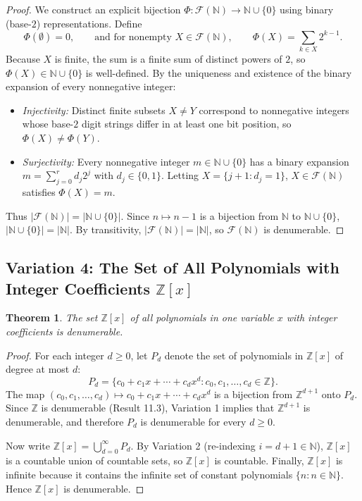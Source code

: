 \documentclass[11pt, letterpaper]{article}
\newtheorem{theorem}{Theorem}[section]
\theoremstyle{definition}
\theoremstyle{remark}
\begin{document}
\begin{proof}
We construct an explicit bijection $\Phi : \mathcal{F}(\mathbb{N}) \to \mathbb{N} \cup \{0\}$ using binary (base-$2$) representations. Define
\[
\Phi(\emptyset) = 0, \qquad \text{and for nonempty } X \in \mathcal{F}(\mathbb{N}), \qquad \Phi(X) = \sum_{k \in X} 2^{k - 1}.
\]
Because $X$ is finite, the sum is a finite sum of distinct powers of $2$, so $\Phi(X) \in \mathbb{N} \cup \{0\}$ is well-defined. By the uniqueness and existence of the binary expansion of every nonnegative integer:
\begin{itemize}
    \item \emph{Injectivity:} Distinct finite subsets $X \neq Y$ correspond to nonnegative integers whose base-$2$ digit strings differ in at least one bit position, so $\Phi(X) \neq \Phi(Y)$.
    \item \emph{Surjectivity:} Every nonnegative integer $m \in \mathbb{N} \cup \{0\}$ has a binary expansion $m = \sum_{j=0}^{r} d_j 2^j$ with $d_j \in \{0, 1\}$. Letting $X = \{j + 1 : d_j = 1\}$, $X \in \mathcal{F}(\mathbb{N})$ satisfies $\Phi(X) = m$.
\end{itemize}
Thus $|\mathcal{F}(\mathbb{N})| = |\mathbb{N} \cup \{0\}|$. Since $n \mapsto n - 1$ is a bijection from $\mathbb{N}$ to $\mathbb{N} \cup \{0\}$, $|\mathbb{N} \cup \{0\}| = |\mathbb{N}|$. By transitivity, $|\mathcal{F}(\mathbb{N})| = |\mathbb{N}|$, so $\mathcal{F}(\mathbb{N})$ is denumerable.
\end{proof}

\subsection{Variation 4: The Set of All Polynomials with Integer Coefficients $\mathbb{Z}[x]$}

\begin{theorem}
The set $\mathbb{Z}[x]$ of all polynomials in one variable $x$ with integer coefficients is denumerable.
\end{theorem}

\begin{proof}
For each integer $d \ge 0$, let $P_d$ denote the set of polynomials in $\mathbb{Z}[x]$ of degree at most $d$:
\[
P_d = \{c_0 + c_1 x + \cdots + c_d x^d : c_0, c_1, \dots, c_d \in \mathbb{Z}\}.
\]
The map $(c_0, c_1, \dots, c_d) \mapsto c_0 + c_1 x + \cdots + c_d x^d$ is a bijection from $\mathbb{Z}^{d+1}$ onto $P_d$. Since $\mathbb{Z}$ is denumerable (Result 11.3), Variation 1 implies that $\mathbb{Z}^{d+1}$ is denumerable, and therefore $P_d$ is denumerable for every $d \ge 0$.

Now write $\mathbb{Z}[x] = \bigcup_{d=0}^{\infty} P_d$. By Variation 2 (re-indexing $i = d + 1 \in \mathbb{N}$), $\mathbb{Z}[x]$ is a countable union of countable sets, so $\mathbb{Z}[x]$ is countable. Finally, $\mathbb{Z}[x]$ is infinite because it contains the infinite set of constant polynomials $\{n : n \in \mathbb{N}\}$. Hence $\mathbb{Z}[x]$ is denumerable.
\end{proof}
\end{document}
